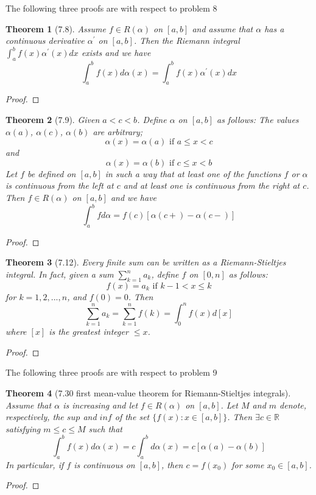 \documentclass[aps,pra,notitlepage,amsmath,amssymb,letterpaper,12pt]{revtex4-1}
\newtheorem{theorem}{Theorem}
\begin{document}
The following three proofs are with respect to problem 8
\begin{theorem}[7.8]
Assume $f \in R(\alpha)$ on $[a,b]$ and assume that $\alpha$ has a continuous derivative $\alpha^\prime$ on $[a,b]$. Then the Riemann integral $\int_{a}^{b} f(x) \alpha^\prime(x)dx$ exists and we have
\[\int_{a}^{b} f(x) d\alpha(x) = \int_{a}^{b} f(x) \alpha^\prime(x)dx\]
\end{theorem}
\begin{proof}
\end{proof}

\begin{theorem}[7.9]
Given $a < c < b$. Define $\alpha$ on $[a,b]$ as follows: The values $\alpha(a)$, $\alpha(c)$, $\alpha(b)$ are arbitrary;
\[\alpha(x) = \alpha(a) \textrm{ if } a \leq x < c\]
and
\[\alpha(x) = \alpha(b) \textrm{ if } c \leq x < b\]
Let $f$ be defined on $[a,b]$ in such a way that at least one of the functions $f$ or $\alpha$ is continuous from the left at $c$ and at least one is continuous from the right at $c$. Then $f \in R(\alpha)$ on $[a,b]$ and we have
\[\int_{a}^{b} f d\alpha = f(c)[\alpha(c+) - \alpha(c-)]\]
\end{theorem}
\begin{proof}
\end{proof}

\begin{theorem}[7.12]
Every finite sum can be written as a Riemann-Stieltjes integral. In fact, given a sum $\sum_{k=1}^{n} a_{k}$, define $f$ on $[0,n]$ as follows:
\[f(x) = a_{k}  \textrm{  if  }  k-1 < x \leq k\]
for $k=1,2,...,n$, and $f(0) = 0$. Then
\[\sum_{k=1}^{n}a_{k} = \sum_{k=1}^{n}f(k) = \int_{0}^{n}f(x)d[x]\]
where $[x]$ is the greatest integer $\leq x$.
\end{theorem}
\begin{proof}
\end{proof}

The following three proofs are with respect to problem 9
\begin{theorem}[7.30 first mean-value theorem for Riemann-Stieltjes integrals]
Assume that $\alpha$ is increasing and let $f \in R(\alpha)$ on $[a,b]$. Let $M$ and $m$ denote, respectively, the $sup$ and $inf$ of the set $\{f(x):x \in [a,b]\}$. Then $\exists c \in \mathbb{R}$ satisfying $m \leq c \leq M$ such that
\[\int_{a}^{b}f(x)d\alpha(x) = c\int_{a}^{b}d\alpha(x) = c[\alpha(a)-\alpha(b)]\]
In particular, if $f$ is continuous on $[a,b]$, then $c=f(x_{0})$ for some $x_{0} \in [a,b]$.
\end{theorem}
\begin{proof}
\end{proof}
\end{document}
